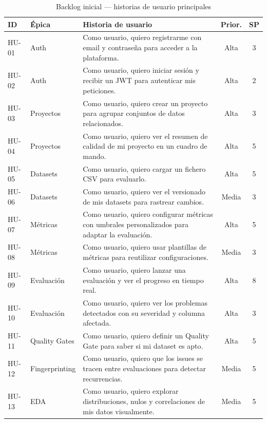 \begin{table}[!t]
  \centering
  \small
  \caption{Backlog inicial — historias de usuario principales}
  \label{tab:backlog-hu}
  \begin{tabularx}{\textwidth}{l l X c c}
    \toprule
    \textbf{ID} & \textbf{Épica} & \textbf{Historia de usuario} &
      \textbf{Prior.} & \textbf{SP} \\
    \midrule
    HU-01 & Auth    & Como usuario, quiero registrarme con email y contraseña
      para acceder a la plataforma. & Alta & 3 \\
    HU-02 & Auth    & Como usuario, quiero iniciar sesión y recibir un JWT para
      autenticar mis peticiones. & Alta & 2 \\
    HU-03 & Proyectos & Como usuario, quiero crear un proyecto para agrupar
      conjuntos de datos relacionados. & Alta & 3 \\
    HU-04 & Proyectos & Como usuario, quiero ver el resumen de calidad de mi
      proyecto en un cuadro de mando. & Alta & 5 \\
    HU-05 & Datasets  & Como usuario, quiero cargar un fichero \ac{CSV}
      para evaluarlo. & Alta & 5 \\
    HU-06 & Datasets  & Como usuario, quiero ver el versionado de mis datasets
      para rastrear cambios. & Media & 3 \\
    HU-07 & Métricas  & Como usuario, quiero configurar métricas con umbrales
      personalizados para adaptar la evaluación. & Alta & 5 \\
    HU-08 & Métricas  & Como usuario, quiero usar plantillas de métricas para
      reutilizar configuraciones. & Media & 3 \\
    HU-09 & Evaluación & Como usuario, quiero lanzar una evaluación y ver el
      progreso en tiempo real. & Alta & 8 \\
    HU-10 & Evaluación & Como usuario, quiero ver los problemas detectados con
      su severidad y columna afectada. & Alta & 3 \\
    HU-11 & Quality Gates & Como usuario, quiero definir un Quality Gate para
      saber si mi dataset es apto. & Alta & 5 \\
    HU-12 & Fingerprinting & Como usuario, quiero que los issues se tracen
      entre evaluaciones para detectar recurrencias. & Media & 5 \\
    HU-13 & \ac{EDA}       & Como usuario, quiero explorar distribuciones, nulos y
      correlaciones de mis datos visualmente. & Media & 5 \\

\end{tabularx}
\end{table}
